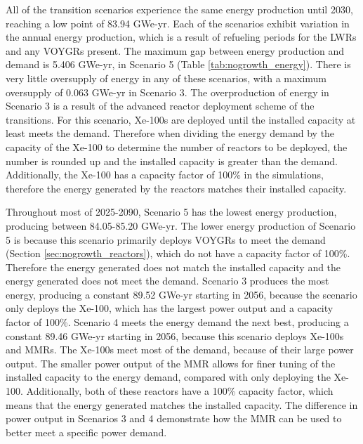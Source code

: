 All of the 
transition scenarios experience the same energy production until 2030,
reaching a low point of 83.94 GWe-yr. Each of the scenarios exhibit 
variation 
in the annual energy production, which is a result of refueling 
periods for the \glspl{LWR} and any VOYGRs present. The maximum gap between 
energy production and demand is 5.406 GWe-yr, in Scenario 5 
(Table \ref{tab:nogrowth_energy}). There 
is very little oversupply of energy in any of these scenarios, with a 
maximum oversupply of 0.063 GWe-yr in Scenario 3. The overproduction of 
energy in Scenario 3 is a result of the advanced reactor deployment scheme 
of the transitions. For this scenario, Xe-100s are deployed until the 
installed capacity at least meets the demand. Therefore when dividing the 
energy demand by the capacity of the Xe-100 to determine the number of 
reactors to be deployed, the number is rounded up and the installed capacity 
is greater than the demand. Additionally, the Xe-100
has a capacity factor of 100\% in the simulations, therefore the energy
generated by the reactors matches their installed capacity. 

Throughout 
most of 2025-2090, Scenario 5 has the 
lowest energy 
production, producing between 84.05-85.20 GWe-yr. The lower energy 
production of Scenario 5 is because this scenario primarily deploys 
VOYGRs to meet the demand (Section \ref{sec:nogrowth_reactors}), which do 
not have a capacity factor of 100\%. Therefore the energy generated does 
not match the installed capacity and the energy generated does not meet the 
demand. 
Scenario 3 
produces the most energy, producing a constant 89.52 GWe-yr starting in 2056,
because the scenario only deploys the Xe-100, which has the largest 
power output  
and a capacity factor of 100\%.  Scenario 4 meets the 
energy demand the next best, producing a constant 89.46 GWe-yr starting in 
2056, because this scenario deploys Xe-100s and \glspl{MMR}. The 
Xe-100s meet most of the demand, because of their large power output.
The smaller power output of the \gls{MMR} allows for finer tuning of the 
installed capacity to the energy demand, compared with only deploying 
the Xe-100. Additionally, both of these reactors have a 100\% capacity 
factor, which means that the energy generated matches the installed capacity. 
The difference in power output in Scenarios 3 and 4 demonstrate how the 
\gls{MMR} can be used to better 
meet a specific power demand. 

